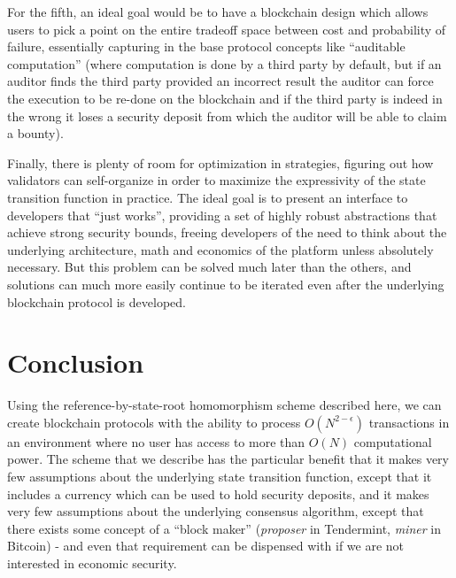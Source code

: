 \documentclass[11pt,a4paper]{article}
\theoremstyle{plain}
\theoremstyle{definition}
\theoremstyle{remark}
\begin{document}
For the fifth, an ideal goal would be to have a blockchain design which allows users to pick a point on the entire tradeoff space between cost and probability of failure, essentially capturing in the base protocol concepts like ``auditable computation'' \cite{auditable} (where computation is done by a third party by default, but if an auditor finds the third party provided an incorrect result the auditor can force the execution to be re-done on the blockchain and if the third party is indeed in the wrong it loses a security deposit from which the auditor will be able to claim a bounty).

Finally, there is plenty of room for optimization in strategies, figuring out how validators can self-organize in order to maximize the expressivity of the state transition function in practice. The ideal goal is to present an interface to developers that ``just works'', providing a set of highly robust abstractions that achieve strong security bounds, freeing developers of the need to think about the underlying architecture, math and economics of the platform unless absolutely necessary. But this problem can be solved much later than the others, and solutions can much more easily continue to be iterated even after the underlying blockchain protocol is developed.

\section{Conclusion}

Using the reference-by-state-root homomorphism scheme described here, we can create blockchain protocols with the ability to process $O(N^{2-\epsilon})$ transactions in an environment where no user has access to more than $O(N)$ computational power. The scheme that we describe has the particular benefit that it makes very few assumptions about the underlying state transition function, except that it includes a currency which can be used to hold security deposits, and it makes very few assumptions about the underlying consensus algorithm, except that there exists some concept of a ``block maker'' (\emph{proposer} in Tendermint, \emph{miner} in Bitcoin) - and even that requirement can be dispensed with if we are not interested in economic security.
\end{document}
